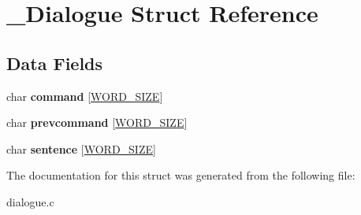 \hypertarget{struct__Dialogue}{}\section{\+\_\+\+Dialogue Struct Reference}
\label{struct__Dialogue}
\subsection*{Data Fields}
\begin{DoxyCompactItemize}
\item 
\mbox{\label{struct__Dialogue_a04623fbf156584dd155cc3d8fd82a4f6}} 
char {\bfseries command} \mbox{[}\hyperlink{types_8h_a92ed8507d1cd2331ad09275c5c4c1c89}{W\+O\+R\+D\+\_\+\+S\+I\+ZE}\mbox{]}
\item 
\mbox{\label{struct__Dialogue_a48908ab44bbf890893c26fd11d043f30}} 
char {\bfseries prevcommand} \mbox{[}\hyperlink{types_8h_a92ed8507d1cd2331ad09275c5c4c1c89}{W\+O\+R\+D\+\_\+\+S\+I\+ZE}\mbox{]}
\item 
\mbox{\label{struct__Dialogue_a879e44ef94e068fb434feae185e58b30}} 
char {\bfseries sentence} \mbox{[}\hyperlink{types_8h_a92ed8507d1cd2331ad09275c5c4c1c89}{W\+O\+R\+D\+\_\+\+S\+I\+ZE}\mbox{]}
\end{DoxyCompactItemize}


The documentation for this struct was generated from the following file\+:\begin{DoxyCompactItemize}
\item 
dialogue.\+c\end{DoxyCompactItemize}
